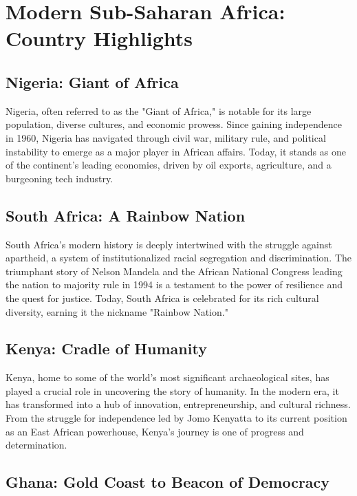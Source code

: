 \documentclass[a4paper,12pt]{book}
\begin{document}
\section{Modern Sub-Saharan Africa: Country Highlights}
\label{sec:modern-sub-saharan-africa}

\subsection{Nigeria: Giant of Africa}
\label{subsec:nigeria}

Nigeria, often referred to as the "Giant of Africa," is notable for its large population, diverse cultures, and economic prowess. Since gaining independence in 1960, Nigeria has navigated through civil war, military rule, and political instability to emerge as a major player in African affairs. Today, it stands as one of the continent’s leading economies, driven by oil exports, agriculture, and a burgeoning tech industry.

\subsection{South Africa: A Rainbow Nation}
\label{subsec:south-africa}

South Africa’s modern history is deeply intertwined with the struggle against apartheid, a system of institutionalized racial segregation and discrimination. The triumphant story of Nelson Mandela and the African National Congress leading the nation to majority rule in 1994 is a testament to the power of resilience and the quest for justice. Today, South Africa is celebrated for its rich cultural diversity, earning it the nickname "Rainbow Nation."

\subsection{Kenya: Cradle of Humanity}
\label{subsec:kenya}

Kenya, home to some of the world's most significant archaeological sites, has played a crucial role in uncovering the story of humanity. In the modern era, it has transformed into a hub of innovation, entrepreneurship, and cultural richness. From the struggle for independence led by Jomo Kenyatta to its current position as an East African powerhouse, Kenya's journey is one of progress and determination.

\subsection{Ghana: Gold Coast to Beacon of Democracy}
\label{subsec:ghana}
\end{document}
